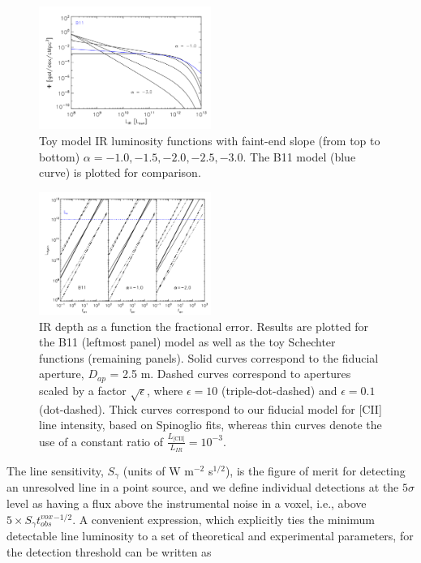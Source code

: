 \documentclass[iop]{emulateapj}
\begin{document}
\begin{figure}
\centering
\includegraphics[width=0.5\textwidth]{phi_lir_schechter_bethermin11_Lstar1d12_Lmin1d8_Lmax1d13}
\caption{Toy model IR luminosity functions with faint-end slope (from top to bottom) $\alpha=-1.0, -1.5, -2.0, -2.5, -3.0$. The B11 model (blue curve) is plotted for comparison.}
\label{fig:schechterfuncs}
\end{figure}

\begin{figure}
\centering
\includegraphics[width=0.5\textwidth]{lirmin_ferr_b11_alpham1p0_alpham2p0_lstar1d12}
\caption{IR depth as a function the fractional error. Results are plotted for the B11 (leftmost panel) model as well as the toy Schechter functions (remaining panels). Solid curves correspond to the fiducial aperture, $D_{ap}$ = 2.5 m. Dashed curves correspond to apertures scaled by a factor $\sqrt{\epsilon}$, where $\epsilon=10$ (triple-dot-dashed) and $\epsilon=0.1$ (dot-dashed). Thick curves correspond to our fiducial model for [CII] line intensity, based on Spinoglio fits, whereas thin curves denote the use of a constant ratio of $\frac{L_{\textrm{[CII]}}}{L_{IR}} = 10^{-3}$.}
\label{fig:lirmin_ferr}
\end{figure}

The line sensitivity, $S_{\gamma}$ (units of W m$^{-2}$ s$^{1/2}$), is the figure of merit for detecting an unresolved line in a point source, and we define individual detections at the $5\sigma$ level as having a flux above the instrumental noise in a voxel, i.e., above $5 \times S_{\gamma} t_{obs}^{vox}^{-1/2}$. A convenient expression, which explicitly ties the minimum detectable line luminosity to a set of theoretical and experimental parameters, for the detection threshold can be written as
\end{document}
